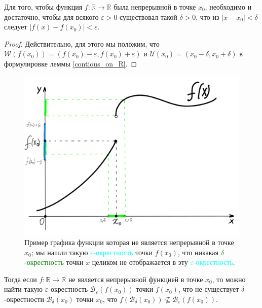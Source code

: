 \begin{corollary}\label{reform_of_cont}
  Для того, чтобы функция $f:\mathbb{R} \to \mathbb{R}$ была непрерывной в точке $x_0$, необходимо и достаточно, чтобы для всякого $\varepsilon>0$ существовал такой $\delta >0$, что из $|x-x_0|<\delta$ следует $|f(x)-f(x_0)|<\varepsilon$.    
\end{corollary}

\begin{proof}
    Действительно, для этого мы положим, что $\mathscr{W}(f(x_0)) = (f(x_0)-\varepsilon, f(x_0) + \varepsilon)$ и $\mathscr{U}(x_0) = (x_0-\delta,x_0 + \delta)$ в формулировке леммы \ref{contious_on_R}.
\end{proof}

\begin{figure}[h!]
    \centering
    \includegraphics[width=0.7\linewidth]{images/non_continous.png}
    \caption{Пример графика функции которая не является непрерывной в точке $x_0$; мы нашли такую \textcolor{cyan}{$\varepsilon$-окрестность} точки $f(x_0)$, что никакая \textcolor{green}{$\delta$-окрестность} точки $x$ целиком не отображается в эту \textcolor{cyan}{$\varepsilon$-окрестность}.}
    \label{fig:enter-label}
\end{figure}

\begin{remark}\label{not_continous}
Тогда если $f:\mathbb{R} \to \mathbb{R}$ не является непрерывной функцией  в точке $x_0$, то можно найти такую $\varepsilon$-окрестность $\mathscr{B}_\varepsilon(f(x_0))$ точки $f(x_0)$, что не существует $\delta$-окрестности $\mathscr{B}_\delta(x_0)$ точки $x_0$, что $f(\mathscr{B}_\delta(x_0)) \not \subseteq \mathscr{B}_\varepsilon(f(x_0))$. 
\end{remark}



